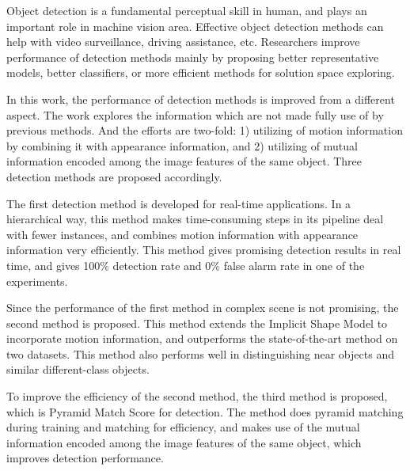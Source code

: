 \begin{eabstract}


Object detection is a fundamental perceptual skill in human, and plays an important role in machine vision area. Effective object detection methods can help with video surveillance, driving assistance, etc. Researchers improve performance of detection methods mainly by proposing better representative models, better classifiers, or more efficient methods for  solution space exploring.

In this work, the performance of detection methods is improved from a different aspect. The work explores the information which are not made fully use of by previous methods. And the efforts are two-fold: 1) utilizing of motion information by combining it   with appearance information, and 2) utilizing of mutual information encoded among the image features of the same object. Three detection methods are proposed accordingly.

The first detection method is developed for real-time applications. In a hierarchical way, this method makes time-consuming steps in its pipeline deal with fewer instances, and combines motion information with appearance information very efficiently. This method gives promising detection results in real time, and gives 100\% detection rate and 0\% false alarm rate in one of the experiments.

Since the performance of the first method in complex scene is not promising, the second method is proposed. This method extends the Implicit Shape Model to incorporate motion information, and outperforms the state-of-the-art method on two datasets. This method also performs well in distinguishing near objects and similar different-class objects.

To improve the efficiency of the second method, the third method is proposed, which is Pyramid Match Score for detection. The method does pyramid matching during training and matching for efficiency, and makes use of the mutual information encoded among the image features of the same object, which improves detection performance.
\end{eabstract}



